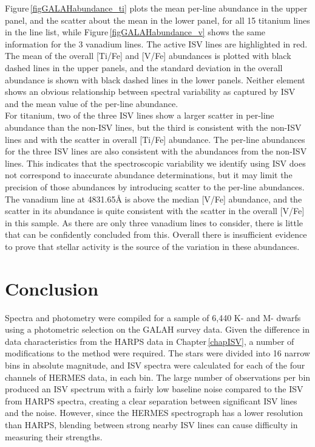 Figure\,\ref{figGALAHabundance_ti} plots the mean per-line abundance in the upper panel, and the scatter about the mean in the lower panel, for all 15 titanium lines in the line list, while Figure\,\ref{figGALAHabundance_v} shows the same information for the 3 vanadium lines. The active ISV lines are highlighted in red. The mean of the overall [Ti/Fe] and [V/Fe] abundances is plotted with black dashed lines in the upper panels, and the standard deviation in the overall abundance is shown with black dashed lines in the lower panels. Neither element shows an obvious relationship between spectral variability as captured by ISV and the mean value of the per-line abundance. \\

For titanium, two of the three ISV lines show a larger scatter in per-line abundance than the non-ISV lines, but the third is consistent with the non-ISV lines and with the scatter in overall [Ti/Fe] abundance. The per-line abundances for the three ISV lines are also consistent with the abundances from the non-ISV lines. This indicates that the spectroscopic variability we identify using ISV does not correspond to inaccurate abundance determinations, but it may limit the precision of those abundances by introducing scatter to the per-line abundances. The vanadium line at 4831.65\hbox{\AA} is above the median [V/Fe] abundance, and the scatter in its abundance is quite consistent with the scatter in the overall [V/Fe] in this sample. As there are only three vanadium lines to consider, there is little that can be confidently concluded from this. Overall there is insufficient evidence to prove that stellar activity is the source of the variation in these abundances.\\

\section{Conclusion}
\label{secGALAHconclusion}
Spectra and photometry were compiled for a sample of 6,440 K- and M- dwarfs using a photometric selection on the GALAH survey data. Given the difference in data characteristics from the HARPS data in Chapter\,\ref{chapISV}, a number of modifications to the method were required. The stars were divided 
into 16 narrow bins in absolute magnitude, and ISV spectra were calculated for each of the four channels of HERMES data, in each bin. The large number of observations per bin produced an ISV spectrum with a fairly low baseline noise compared to the ISV from HARPS spectra, creating a clear separation between significant ISV lines and the noise. However, since the HERMES spectrograph has a lower resolution than HARPS, blending between strong nearby ISV lines can cause difficulty in measuring their strengths.\\

